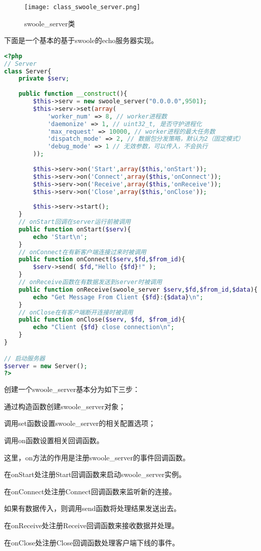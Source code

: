 \begin{figure}[htbp]
\centering
\texttt{[image: class\_swoole\_server.png]}
\caption{swoole\_server类}
\end{figure}


下面是一个基本的基于swoole的echo服务器实现。



\begin{lstlisting}[language=PHP]
<?php
// Server
class Server{
	private $serv;
	
	public function __construct(){
		$this->serv = new swoole_server("0.0.0.0",9501);
		$this->serv->set(array(
			'worker_num' => 8, // worker进程数
			'daemonize' => 1, // uint32_t, 是否守护进程化
			'max_request' => 10000, // worker进程的最大任务数
			'dispatch_mode' => 2, // 数据包分发策略，默认为2（固定模式）
			'debug_mode' => 1 // 无效参数，可以传入，不会执行
		));
		
		$this->serv->on('Start',array($this,'onStart'));
		$this->serv->on('Connect',array($this,'onConnect'));
		$this->serv->on('Receive',array($this,'onReceive'));
		$this->serv->on('Close',array($this,'onClose'));
		
		$this->serv->start();
	}
	// onStart回调在server运行前被调用
	public function onStart($serv){ 
		echo 'Start\n';
	}
	// onConnect在有新客户端连接过来时被调用
	public function onConnect($serv,$fd,$from_id){ 
		$serv->send( $fd,"Hello {$fd}!" );
	}
	// onReceive函数在有数据发送到server时被调用
	public function onReceive(swoole_server $serv,$fd,$from_id,$data){
		echo "Get Message From Client {$fd}:{$data}\n";
	}
	// onClose在有客户端断开连接时被调用
	public function onClose($serv, $fd, $from_id){
		echo "Client {$fd} close connection\n";
	}
}

// 启动服务器
$server = new Server();
?>
\end{lstlisting}

创建一个swoole\_server基本分为如下三步：

\begin{compactitem}
\item 通过构造函数创建swoole\_server对象；
\item 调用set函数设置swoole\_server的相关配置选项；
\item 调用on函数设置相关回调函数。
\end{compactitem}

这里，on方法的作用是注册swoole\_server的事件回调函数。

\begin{compactitem}
\item 在onStart处注册Start回调函数来启动swoole\_server实例。
\item 在onConnect处注册Connect回调函数来监听新的连接。

如果有数据传入，则调用send函数将处理结果发送出去。

\item 在onReceive处注册Receive回调函数来接收数据并处理。
\item 在onClose处注册Close回调函数处理客户端下线的事件。
\end{compactitem}

